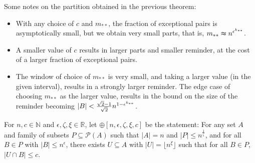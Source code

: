     \begin{remark}
        Some notes on the partition obtained in the previous theorem:
        \begin{itemize}
            \item With any choice of $c$ and $m_{**}$, the fraction of exceptional pairs is asymptotically small,
                but we obtain very small parts, that is, $m_{**} \thickapprox n^{\epsilon^{k_{**}}}$.
            \item A smaller value of $c$ results in larger parts and smaller reminder, at the cost of a larger fraction
                of exceptional pairs.
            \item The window of choice of $m_{**}$ is very small, and taking a larger value
                (in the given interval), results in a strongly larger reminder.
                The edge case of choosing $m_{**}$ as the larger value, results in the bound on the size of the
                reminder becoming $| B | < \frac{\sqrt{2}-1}{\sqrt{2}} n^{1-\epsilon^{k_{**}}}$.
        \end{itemize}
    \end{remark}

    \jojo


    \begin{definition}[Definition 4.18] \label{def:n_large_enough_property}
        For $n, c \in \mathbb{N}$ and $\epsilon, \zeta, \xi \in \mathbb{R}$, let $\oplus[n, \epsilon, \zeta, \xi, c]$ be
        the statement:
        For any set $A$ and family of subsets $P \subseteq \mathcal{P}(A)$ such that $|A| = n$ and $|P| \leq n^{\frac{1}{\zeta}}$,
        and for all $B \in P$ with $|B| \leq n^\epsilon$, there exists $U \subseteq A$ with $|U| = \lfloor n^\xi \rfloor$ such that
        for all $B \in P$, $|U \cap B| \leq c$.
    \end{definition}

